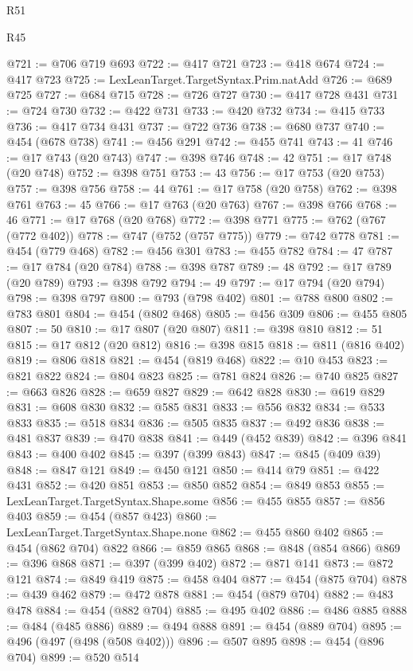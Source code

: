 \begin{lexlean}{R51}
\begin{lexlean}{R45}
\begin{coremodule}
{{{{{{{{{{{{{{{{{{{{{{{{{{{{{{{{{{{{{{{{{{{{{{{{{{{{{{{{{{{{{{{{{{{{{{{{{{{{{{{{{{{{{{{{{{{@721 := @706 @719 @693
@722 := @417 @721
@723 := @418 @674
@724 := @417 @723
@725 := LexLeanTarget.TargetSyntax.Prim.natAdd
@726 := @689 @725
@727 := @684 @715
@728 := @726 @727
@730 := @417 @728 @431
@731 := @724 @730
@732 := @422 @731
@733 := @420 @732
@734 := @415 @733
@736 := @417 @734 @431
@737 := @722 @736
@738 := @680 @737
@740 := @454 (@678 @738)
@741 := @456 @291
@742 := @455 @741
@743 := 41
@746 := @17 @743 (@20 @743)
@747 := @398 @746
@748 := 42
@751 := @17 @748 (@20 @748)
@752 := @398 @751
@753 := 43
@756 := @17 @753 (@20 @753)
@757 := @398 @756
@758 := 44
@761 := @17 @758 (@20 @758)
@762 := @398 @761
@763 := 45
@766 := @17 @763 (@20 @763)
@767 := @398 @766
@768 := 46
@771 := @17 @768 (@20 @768)
@772 := @398 @771
@775 := @762 (@767 (@772 @402))
@778 := @747 (@752 (@757 @775))
@779 := @742 @778
@781 := @454 (@779 @468)
@782 := @456 @301
@783 := @455 @782
@784 := 47
@787 := @17 @784 (@20 @784)
@788 := @398 @787
@789 := 48
@792 := @17 @789 (@20 @789)
@793 := @398 @792
@794 := 49
@797 := @17 @794 (@20 @794)
@798 := @398 @797
@800 := @793 (@798 @402)
@801 := @788 @800
@802 := @783 @801
@804 := @454 (@802 @468)
@805 := @456 @309
@806 := @455 @805
@807 := 50
@810 := @17 @807 (@20 @807)
@811 := @398 @810
@812 := 51
@815 := @17 @812 (@20 @812)
@816 := @398 @815
@818 := @811 (@816 @402)
@819 := @806 @818
@821 := @454 (@819 @468)
@822 := @10 @453
@823 := @821 @822
@824 := @804 @823
@825 := @781 @824
@826 := @740 @825
@827 := @663 @826
@828 := @659 @827
@829 := @642 @828
@830 := @619 @829
@831 := @608 @830
@832 := @585 @831
@833 := @556 @832
@834 := @533 @833
@835 := @518 @834
@836 := @505 @835
@837 := @492 @836
@838 := @481 @837
@839 := @470 @838
@841 := @449 (@452 @839)
@842 := @396 @841
@843 := @400 @402
@845 := @397 (@399 @843)
@847 := @845 (@409 @39)
@848 := @847 @121
@849 := @450 @121
@850 := @414 @79
@851 := @422 @431
@852 := @420 @851
@853 := @850 @852
@854 := @849 @853
@855 := LexLeanTarget.TargetSyntax.Shape.some
@856 := @455 @855
@857 := @856 @403
@859 := @454 (@857 @423)
@860 := LexLeanTarget.TargetSyntax.Shape.none
@862 := @455 @860 @402
@865 := @454 (@862 @704) @822
@866 := @859 @865
@868 := @848 (@854 @866)
@869 := @396 @868
@871 := @397 (@399 @402)
@872 := @871 @141
@873 := @872 @121
@874 := @849 @419
@875 := @458 @404
@877 := @454 (@875 @704)
@878 := @439 @462
@879 := @472 @878
@881 := @454 (@879 @704)
@882 := @483 @478
@884 := @454 (@882 @704)
@885 := @495 @402
@886 := @486 @885
@888 := @484 (@485 @886)
@889 := @494 @888
@891 := @454 (@889 @704)
@895 := @496 (@497 (@498 (@508 @402)))
@896 := @507 @895
@898 := @454 (@896 @704)
@899 := @520 @514
}}}}}}}}}}}}}}}}}}}}}}}}}}}}}}}}}}}}}}}}}}}}}}}}}}}}}}}}}}}}}}}}}}}}}}}}}}}}}}}}}}}}}}}}}}}
\end{coremodule}
\end{lexlean}
\end{lexlean}
